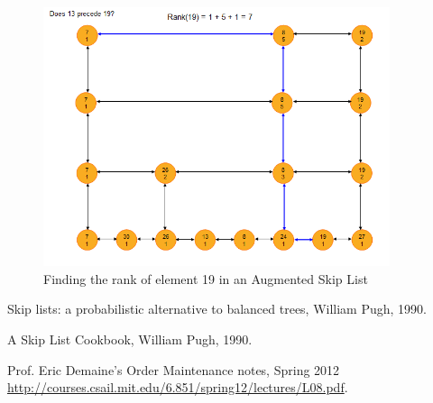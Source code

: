 \documentclass{article}
\begin{document}
\begin{figure}[h!]
  \begin{center}
    \includegraphics[width=4in]{images/OrderMaintenance2.jpg}
    \caption{Finding the rank of element 19 in an Augmented Skip List}
    \label{fig:OrderMaintenance2}
  \end{center}
\end {figure}

\clearpage

\begin{thebibliography}{}

\bibitem{} 
Skip lists: a probabilistic alternative to balanced trees,
William Pugh,
1990.

\bibitem{}
A Skip List Cookbook,
William Pugh,
1990.

\bibitem{} 
Prof. Eric Demaine's Order Maintenance notes,
Spring 2012 \\
\url{http://courses.csail.mit.edu/6.851/spring12/lectures/L08.pdf}.

\end{thebibliography}{}
\end{document}
